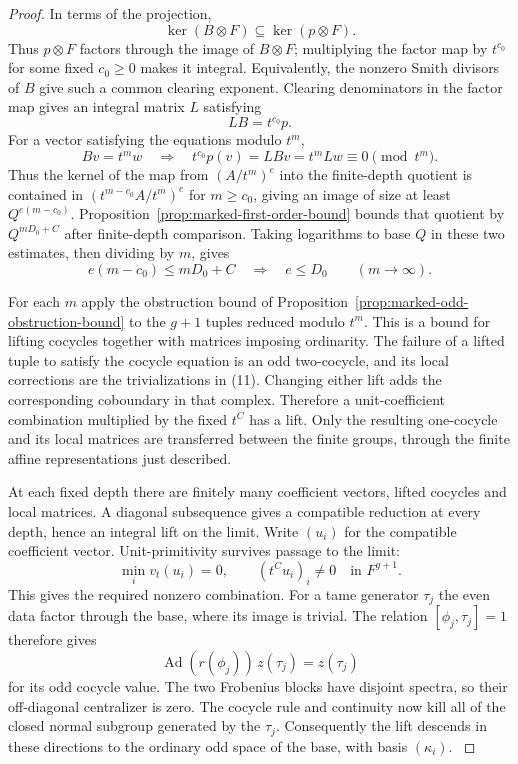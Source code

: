 \begin{proof}
In terms of the projection, 
\[
 \ker(B\otimes F)\subseteq\ker(p\otimes F).
\]
 Thus \(p\otimes F\) factors through the image of \(B\otimes F\); multiplying the factor map by \(t^{c_0}\)
for some fixed \(c_0\ge0\) makes it integral. Equivalently,
the nonzero Smith divisors of \(B\) give such a common
clearing exponent. Clearing denominators in the factor map gives an integral matrix \(L\) satisfying
\[
 LB=t^{c_0}p .
\]
For a vector satisfying the equations modulo \(t^m\),
\[
 Bv=t^mw\quad\Longrightarrow\quad
 t^{c_0}p(v)=L Bv=t^m Lw\equiv0\pmod{t^m}.
\]
Thus the kernel of the map from \((A/t^m)^e\) into the
finite-depth quotient is contained in
\((t^{m-c_0}A/t^m)^e\) for \(m\ge c_0\), giving an image
of size at least \(Q^{e(m-c_0)}\).
Proposition~\ref{prop:marked-first-order-bound} bounds that
quotient by \(Q^{mD_0+C}\) after finite-depth comparison.
Taking logarithms to base \(Q\) in these two estimates, then dividing by \(m\), gives
\[
 e(m-c_0)\le mD_0+C\quad\Longrightarrow\quad e\le D_0\qquad(m\to\infty).
\]

For each \(m\) apply the obstruction bound of
Proposition~\ref{prop:marked-odd-obstruction-bound} to the
\(g+1\) tuples reduced modulo \(t^m\). This is a bound for
lifting cocycles together with matrices imposing ordinarity. The failure
of a lifted tuple to satisfy the cocycle equation is an odd
two-cocycle, and its local corrections are the trivializations
in \textup{(11)}. Changing either lift adds the corresponding
coboundary in that complex. Therefore a unit-coefficient
combination multiplied by the fixed \(t^C\) has a lift.
Only the resulting one-cocycle and its local matrices are
transferred between the finite groups, through the finite
affine representations just described.

At each fixed depth there are finitely many coefficient vectors,
lifted cocycles and local matrices. A diagonal subsequence gives a
compatible reduction at every depth, hence an integral lift on
the limit. Write \((u_i)\) for the compatible coefficient vector. Unit-primitivity survives passage to the limit: 
\[
 \min_i v_t(u_i)=0,\qquad (t^Cu_i)_i\ne0\quad\text{in }F^{g+1}.
\]
 This gives the required nonzero combination. For a tame generator \(\tau_j\) the even data factor
through the base, where its image is trivial. The relation
\([\phi_j,\tau_j]=1\) therefore gives
\[
  \operatorname{Ad}(r(\phi_j))\,z(\tau_j)=z(\tau_j)
\]
for its odd cocycle value. The two Frobenius blocks have disjoint
spectra, so their off-diagonal centralizer is zero. The cocycle
rule and continuity now kill all of the closed normal subgroup
generated by the \(\tau_j\). Consequently the lift descends in
these directions to the ordinary odd space of the base, with
basis \((\kappa_i)\).
\label{cor:ordinary-patching-cotangent-3}


\end{proof}
